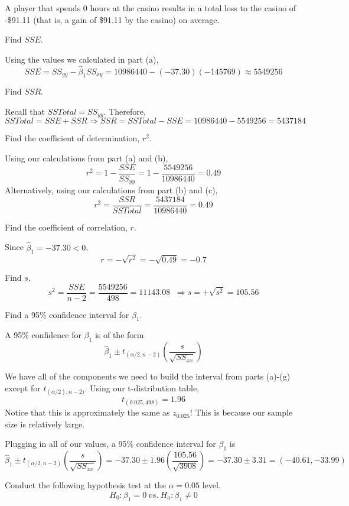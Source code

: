 \begin{example}
\begin{benumerate}
A player that spends 0 hours at the casino results in a total loss to the casino of -\$91.11 (that is, a gain of \$91.11 by the casino) on average. 

\item Find $SSE$.

Using the values we calculated in part (a),
\[ SSE = SS_{yy} - \hat{\beta}_1 SS_{xy} = 10986440 - (-37.30)(-145769) \approx 5549256\]

\item Find $SSR$.

Recall that $SSTotal = SS_{yy}$. Therefore,
\[ SSTotal = SSE + SSR \Rightarrow SSR = SSTotal - SSE = 10986440 - 5549256 = 5437184\]

\item Find the coefficient of determination, $r^2$.

Using our calculations from part (a) and (b),
\[ r^2 = 1 - \frac{SSE}{SS_{yy}} = 1 - \frac{5549256}{10986440}=0.49\]
Alternatively, using our calculations from  part (b) and (c),
\[ r^2 = \frac{SSR}{SSTotal}  = \frac{5437184}{10986440}=0.49\]

\item Find the coefficient of correlation, $r$.

Since $\hat{\beta}_1 = -37.30 < 0$,
\[ r = - \sqrt{r^2} = - \sqrt{0.49} = -0.7 \]

\item Find $s$.
\[ s^2 = \frac{SSE}{n-2} = \frac{5549256}{498} = 11143.08 \; \; \Rightarrow s = +\sqrt{s^2} = 105.56\]

\item Find a 95\% confidence interval for $\beta_1$.

A 95\% confidence for $\beta_1$ is of the form
\[ \hat{\beta}_1 \pm t_{(\alpha/2,n-2)}\left( \frac{s} {\sqrt{SS_{xx}}}\right)\]

We have all of the components we need to build the interval from parts (a)-(g) except for $t_{(\alpha/2),n-2)}$. Using our t-distribution table,
\[ t_{(0.025,498)}=1.96\]
Notice that this is approximately the same as $z_0.025$! This is because our sample size is relatively large.

Plugging in all of our values, a 95\% confidence interval for $\beta_1$ is
\[ \hat{\beta}_1 \pm t_{(\alpha/2,n-2)}\left( \frac{s} {\sqrt{SS_{xx}}}\right) = -37.30 \pm 1.96 \left( \frac{105.56}{\sqrt{3908}}\right) = -37.30 \pm 3.31 = (-40.61, -33.99)\]

\item Conduct the following hypothesis test at the $\alpha=0.05$ level.
\[ H_0 : \beta_1 = 0~vs.~ H_a: \beta_1 \neq 0 \]


\end{benumerate}
\end{example}
